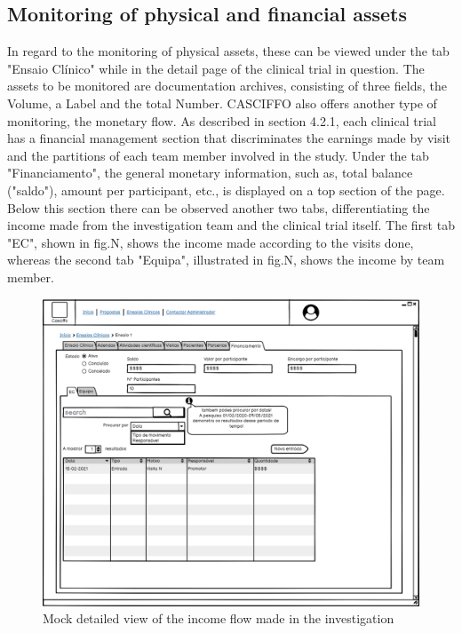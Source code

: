 \subsection{Monitoring of physical and financial assets} 
In regard to the monitoring of physical assets, these can be viewed under the tab "Ensaio Clínico" while in the detail page of the clinical trial in question. The assets to be monitored are documentation archives, consisting of three fields, the Volume, a Label and the total Number.
CASCIFFO also offers another type of monitoring, the monetary flow. As described in section 4.2.1, each clinical trial has a financial management section that discriminates the earnings made by visit and the partitions of each team member involved in the study.  
Under the tab "Financiamento", the general monetary information, such as, total balance ("saldo"), amount per participant, etc., is displayed on a top section of the page. Below this section there can be observed another two tabs, differentiating the income made from the investigation team and the clinical trial itself. The first tab "EC", shown in fig.N, shows the income made according to the visits done, whereas the second tab "Equipa", illustrated in fig.N, shows the income by team member.

\begin{figure}
    \centering
    \includegraphics{images/ensaio-finance-ec.png}
    \caption{Mock detailed view of the income flow made in the investigation}
    \label{fig:ensaio-finance-ec}
\end{figure}


